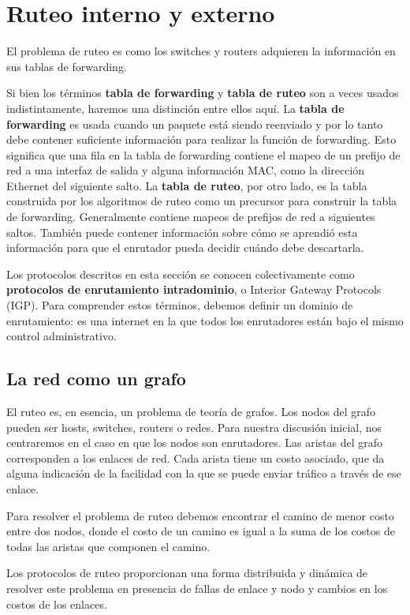 \section{Ruteo interno y externo}
El problema de ruteo es como los switches y routers adquieren la información en sus tablas de forwarding.

Si bien los términos \textbf{tabla de forwarding} y \textbf{tabla de ruteo} son a veces usados indistintamente, haremos una distinción entre ellos aquí. La \textbf{tabla de forwarding} es usada cuando un paquete está siendo reenviado y por lo tanto debe contener suficiente información para realizar la función de forwarding. Esto significa que una fila en la tabla de forwarding contiene el mapeo de un prefijo de red a una interfaz de salida y alguna información MAC, como la dirección Ethernet del siguiente salto. La \textbf{tabla de ruteo}, por otro lado, es la tabla construida por los algoritmos de ruteo como un precursor para construir la tabla de forwarding. Generalmente contiene mapeos de prefijos de red a siguientes saltos. También puede contener información sobre cómo se aprendió esta información para que el enrutador pueda decidir cuándo debe descartarla.

Los protocolos descritos en esta sección se conocen colectivamente como \textbf{protocolos de enrutamiento intradominio}, o Interior Gateway Protocols (IGP). Para comprender estos términos, debemos definir un dominio de enrutamiento: es una internet en la que todos los enrutadores están bajo el mismo control administrativo.

\subsection{La red como un grafo}
El ruteo es, en esencia, un problema de teoría de grafos. Los nodos del grafo pueden ser hosts, switches, routers o redes. Para nuestra discusión inicial, nos centraremos en el caso en que los nodos son enrutadores. Las aristas del grafo corresponden a los enlaces de red. Cada arista tiene un costo asociado, que da alguna indicación de la facilidad con la que se puede enviar tráfico a través de ese enlace.

Para resolver el problema de ruteo debemos encontrar el camino de menor costo entre dos nodos, donde el costo de un camino es igual a la suma de los costos de todas las aristas que componen el camino.

Los protocolos de ruteo proporcionan una forma distribuida y dinámica de resolver este problema en presencia de fallas de enlace y nodo y cambios en los costos de los enlaces.

